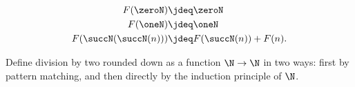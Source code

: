 \begin{exercises}
  \begin{samepage}
    \begin{align*}
      F(\zeroN) & \jdeq \zeroN \\
      F(\oneN) & \jdeq \oneN \\
      F(\succN(\succN(n))) & \jdeq F(\succN(n))+F(n).
    \end{align*}
  \end{samepage}
  \exitem Define division by two rounded down as a function $\N\to\N$ in two ways: first by pattern matching, and then directly by the induction principle of $\N$.
\end{exercises}

